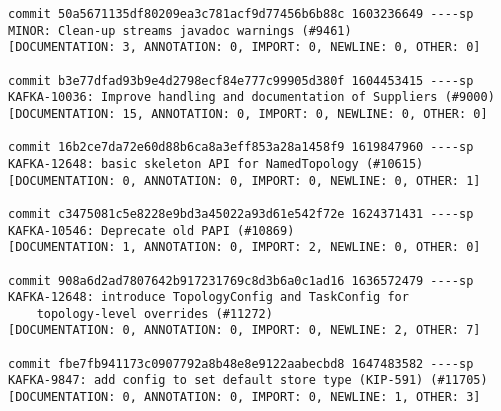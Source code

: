 \begin{mdframed}
\begin{lstlisting}
commit 50a5671135df80209ea3c781acf9d77456b6b88c 1603236649 ----sp 
MINOR: Clean-up streams javadoc warnings (#9461)                                                     
[DOCUMENTATION: 3, ANNOTATION: 0, IMPORT: 0, NEWLINE: 0, OTHER: 0]

commit b3e77dfad93b9e4d2798ecf84e777c99905d380f 1604453415 ----sp 
KAFKA-10036: Improve handling and documentation of Suppliers (#9000)                                 
[DOCUMENTATION: 15, ANNOTATION: 0, IMPORT: 0, NEWLINE: 0, OTHER: 0]

commit 16b2ce7da72e60d88b6ca8a3eff853a28a1458f9 1619847960 ----sp 
KAFKA-12648: basic skeleton API for NamedTopology (#10615)                                           
[DOCUMENTATION: 0, ANNOTATION: 0, IMPORT: 0, NEWLINE: 0, OTHER: 1]

commit c3475081c5e8228e9bd3a45022a93d61e542f72e 1624371431 ----sp 
KAFKA-10546: Deprecate old PAPI (#10869)                                                             
[DOCUMENTATION: 1, ANNOTATION: 0, IMPORT: 2, NEWLINE: 0, OTHER: 0]

commit 908a6d2ad7807642b917231769c8d3b6a0c1ad16 1636572479 ----sp 
KAFKA-12648: introduce TopologyConfig and TaskConfig for 
    topology-level overrides (#11272)
[DOCUMENTATION: 0, ANNOTATION: 0, IMPORT: 0, NEWLINE: 2, OTHER: 7]

commit fbe7fb941173c0907792a8b48e8e9122aabecbd8 1647483582 ----sp 
KAFKA-9847: add config to set default store type (KIP-591) (#11705)                                  
[DOCUMENTATION: 0, ANNOTATION: 0, IMPORT: 0, NEWLINE: 1, OTHER: 3]
\end{lstlisting}
\end{mdframed}


